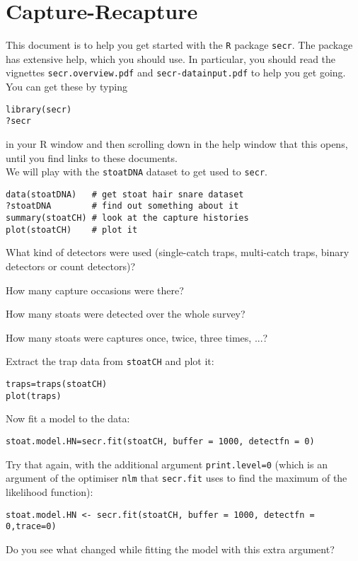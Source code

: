 \chapter{Capture-Recapture\label{ch:cr_comp}}


This document is to help you get started with the \verb|R| package \verb|secr|. The package has extensive help, which you should use. In particular, you should read the vignettes \verb|secr.overview.pdf| and \verb|secr-datainput.pdf| to help you get going. You can get these by typing 

\begin{verbatim}
library(secr)
?secr
\end{verbatim}
in your R window and then scrolling down in the help window that this opens, until you find links to these documents.\\

We will play with the \verb|stoatDNA| dataset to get used to \verb|secr|.

\begin{verbatim}
data(stoatDNA)   # get stoat hair snare dataset
?stoatDNA        # find out something about it
summary(stoatCH) # look at the capture histories
plot(stoatCH)    # plot it
\end{verbatim}

What kind of detectors were used (single-catch traps, multi-catch traps, binary detectors or count detectors)?

How many capture occasions were there?

How many stoats were detected over the whole survey?

How many stoats were captures once, twice, three times, ...?

Extract the trap data from \verb|stoatCH| and plot it:

\begin{verbatim}
traps=traps(stoatCH)
plot(traps)
\end{verbatim}

Now fit a model to the data:

\begin{verbatim}
stoat.model.HN=secr.fit(stoatCH, buffer = 1000, detectfn = 0)
\end{verbatim}

Try that again, with the additional argument \verb|print.level=0| (which is an argument of the optimiser \verb|nlm| that \verb|secr.fit| uses to find the maximum of the likelihood function):

\begin{verbatim}
stoat.model.HN <- secr.fit(stoatCH, buffer = 1000, detectfn = 0,trace=0)
\end{verbatim}
Do you see what changed while fitting the model with this extra argument?\\

